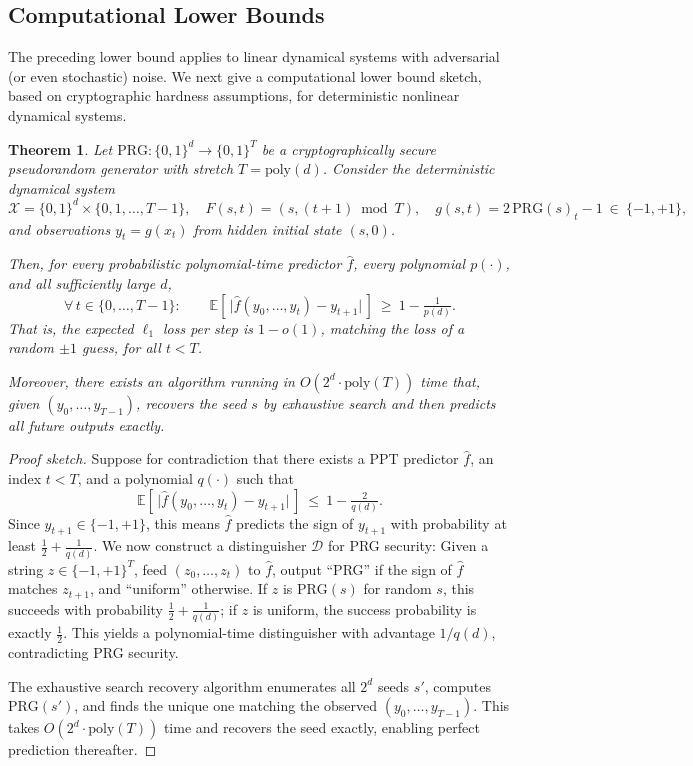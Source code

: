 \documentclass[11pt]{article}
\newtheorem{theorem}{Theorem}[section]
\numberwithin{equation}{section}
\begin{document}
\subsection{Computational Lower Bounds}

The preceding lower bound applies to linear dynamical systems with adversarial (or even stochastic) noise. We next give a computational lower bound sketch, based on cryptographic hardness assumptions,  for deterministic nonlinear dynamical systems.  

\begin{theorem}
\label{thm:computational-lb}
Let $\mathrm{PRG}:\{0,1\}^d \to \{0,1\}^T$ be a cryptographically secure pseudorandom generator with stretch $T=\mathrm{poly}(d)$. 
Consider the deterministic dynamical system
\[
\mathcal{X} = \{0,1\}^d \times \{0,1,\ldots,T-1\},\quad
F(s,t) = (s,(t+1) \bmod T),\quad
g(s,t) = 2\,\mathrm{PRG}(s)_t - 1 \ \in \ \{-1,+1\},
\]
and observations $y_t = g(x_t)$ from hidden initial state $(s,0)$.

Then, for every probabilistic polynomial-time predictor $\widehat{f}$, every polynomial $p(\cdot)$, and all sufficiently large $d$,
\[
\forall\, t\in\{0,\ldots,T-1\}:\qquad
\mathbb{E}\left[\,\big| \widehat{f}(y_0,\ldots,y_t) - y_{t+1} \big|\,\right] 
\ \ge\ 1 - \tfrac{1}{p(d)}.
\]
That is, the expected $\ell_1$ loss per step is $1 - o(1)$, matching the loss of a random $\pm 1$ guess, for all $t<T$.

Moreover, there exists an algorithm running in $O(2^d \cdot \mathrm{poly}(T))$ time that, given $(y_0,\ldots,y_{T-1})$, recovers the seed $s$ by exhaustive search and then predicts all future outputs exactly.
\end{theorem}

\begin{proof}[Proof sketch]
Suppose for contradiction that there exists a PPT predictor $\widehat{f}$, an index $t<T$, and a polynomial $q(\cdot)$ such that 
\[
\mathbb{E}\left[\,\big| \widehat{f}(y_0,\ldots,y_t) - y_{t+1} \big|\,\right] 
\ \le\ 1 - \tfrac{2}{q(d)}.
\]
Since $y_{t+1}\in\{-1,+1\}$, this means $\widehat{f}$ predicts the sign of $y_{t+1}$ with probability at least $\tfrac12 + \tfrac{1}{q(d)}$. 
We now construct a distinguisher $\mathcal{D}$ for PRG security: 
Given a string $z\in\{-1,+1\}^T$, feed $(z_0,\ldots,z_t)$ to $\widehat{f}$, output “PRG” if the sign of $\widehat{f}$ matches $z_{t+1}$, and “uniform” otherwise. 
If $z$ is $\mathrm{PRG}(s)$ for random $s$, this succeeds with probability $\tfrac12+\tfrac{1}{q(d)}$; if $z$ is uniform, the success probability is exactly $\tfrac12$. 
This yields a polynomial-time distinguisher with advantage $1/q(d)$, contradicting PRG security.

The exhaustive search recovery algorithm enumerates all $2^d$ seeds $s'$, computes $\mathrm{PRG}(s')$, and finds the unique one matching the observed $(y_0,\ldots,y_{T-1})$. This takes $O(2^d \cdot \mathrm{poly}(T))$ time and recovers the seed exactly, enabling perfect prediction thereafter.
\end{proof}
\end{document}
